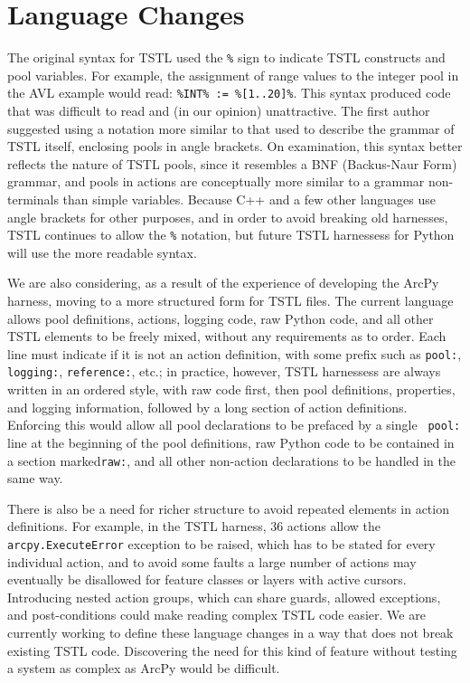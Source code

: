 \section{Language Changes}

The original syntax for TSTL \cite{NFM15} used the {\tt \%} sign to
indicate TSTL constructs and pool variables.  For example, the
assignment of range values to the integer pool in the AVL example
would read:  {\tt \%INT\% := \%[1..20]\%}.  This syntax
produced code that was difficult to read and (in our opinion) unattractive.  The first
author suggested using a notation more similar to that used to
describe the grammar of TSTL itself, enclosing pools in angle
brackets.  On examination, this syntax better reflects the nature of
TSTL pools, since it resembles a BNF (Backus-Naur Form) grammar, and
pools in actions are
conceptually more similar to a grammar non-terminals than simple variables.  Because
C++ and a few other languages use angle brackets for other purposes,
and in order to avoid breaking old harnesses, TSTL continues to allow
the {\tt \%} notation, but future TSTL harnessess for Python will use
the more readable syntax.

We are also considering, as a result of the experience of developing
the ArcPy harness, moving to a more structured form for TSTL files.
The current language allows pool definitions, actions, logging code,
raw Python code, and all other TSTL elements to be freely mixed,
without any requirements as to order.  Each line must indicate if it
is not an action definition, with some prefix such as {\tt pool:},
{\tt logging:}, {\tt reference:}, etc.; in practice, however, TSTL
harnessess are always written in an ordered style, with raw code
first, then pool definitions, properties, and logging information,
followed by a long section of action definitions.  Enforcing this
would allow all pool declarations to be prefaced by a single {\tt
  pool:} line at the beginning of the pool definitions, raw Python
code to be contained in a section marked{\tt raw:}, and all other
non-action declarations to be handled in the same way. 

There is also be a need for richer structure to avoid repeated
elements in action definitions.  For example, in the TSTL harness, 36
actions allow the {\tt arcpy.ExecuteError} exception to be raised,
which has to be stated for every individual action, and to avoid some
faults a large number of actions may eventually be disallowed for
feature classes or layers with active cursors.  Introducing nested
action groups, which can share guards, allowed exceptions, and
post-conditions could make reading complex TSTL code easier.  We are
currently working to define these language changes in a way that does
not break existing TSTL code.  Discovering the need for this kind of
feature without testing a system as complex as ArcPy would be
difficult.
